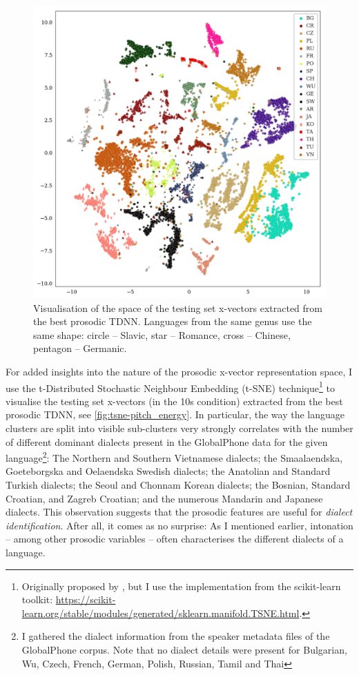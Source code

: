 \documentclass[bsc,frontabs,twoside,singlespacing,parskip,deptreport]{infthesis}
\begin{document}
{{    \begin{figure}[h!]
      \centering
      \includegraphics[width=\textwidth]{../img/tsne-pitch_energy.png}
      \caption{Visualisation of the space of the testing set x-vectors extracted from the best prosodic TDNN. Languages from the same genus use the same shape: circle -- Slavic, star -- Romance, cross -- Chinese, pentagon -- Germanic.}
      \label{fig:tsne-pitch_energy}
    \end{figure}
    For added insights into the nature of the prosodic x-vector representation space, I use the t-Distributed Stochastic Neighbour Embedding (t-SNE) technique\footnote{Originally proposed by \citet{Maaten_Hinton_2008}, but I use the implementation from the scikit-learn toolkit: \url{https://scikit-learn.org/stable/modules/generated/sklearn.manifold.TSNE.html}.} to visualise the testing set x-vectors (in the 10s condition) extracted from the best prosodic TDNN, see \autoref{fig:tsne-pitch_energy}. In particular, the way the language clusters are split into visible sub-clusters very strongly correlates with the number of different dominant dialects present in the GlobalPhone data for the given language\footnote{I gathered the dialect information from the speaker metadata files of the GlobalPhone corpus. Note that no dialect details were present for Bulgarian, Wu, Czech, French, German, Polish, Russian, Tamil and Thai}: The Northern and Southern Vietnamese dialects; the Smaalaendska, Goeteborgska and Oelaendska Swedish dialects; the Anatolian and Standard Turkish dialects; the Seoul and Chonnam Korean dialects; the Bosnian, Standard Croatian, and Zagreb Croatian; and the numerous Mandarin and Japanese dialects. This observation suggests that the prosodic features are useful for \textit{dialect identification}. After all, it comes as no surprise: As I mentioned earlier, intonation -- among other prosodic variables -- often characterises the different dialects of a language.

}}
\end{document}
